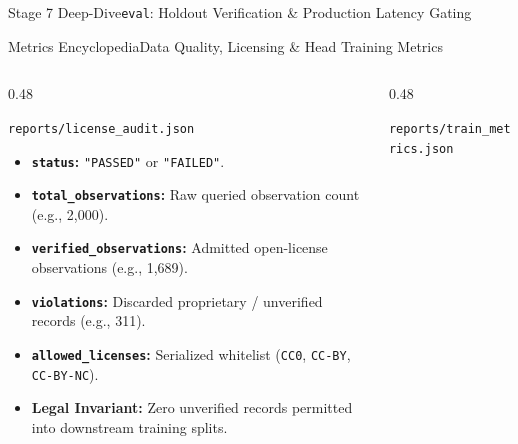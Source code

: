 \begin{frame}{Stage 7 Deep-Dive}{\texttt{eval}: Holdout Verification \& Production Latency Gating}
\end{frame}

\begin{frame}{Metrics Encyclopedia}{Data Quality, Licensing \& Head Training Metrics}
    \begin{columns}[T]
        \begin{column}{0.48\textwidth}
            \begin{block}{\texttt{reports/license\_audit.json}}
                \begin{itemize}\scriptsize
                    \item \textbf{\texttt{status}:} \texttt{"PASSED"} or \texttt{"FAILED"}.
                    \item \textbf{\texttt{total\_observations}:} Raw queried observation count (e.g., 2,000).
                    \item \textbf{\texttt{verified\_observations}:} Admitted open-license observations (e.g., 1,689).
                    \item \textbf{\texttt{violations}:} Discarded proprietary / unverified records (e.g., 311).
                    \item \textbf{\texttt{allowed\_licenses}:} Serialized whitelist (\texttt{CC0}, \texttt{CC-BY}, \texttt{CC-BY-NC}).
                    \item \textbf{Legal Invariant:} Zero unverified records permitted into downstream training splits.
                \end{itemize}
            \end{block}
        \end{column}
        \begin{column}{0.48\textwidth}
            \begin{block}{\texttt{reports/train\_metrics.json}}
                \begin{itemize}\scriptsize

\end{itemize}
\end{block}
\end{column}
\end{columns}
\end{frame}
